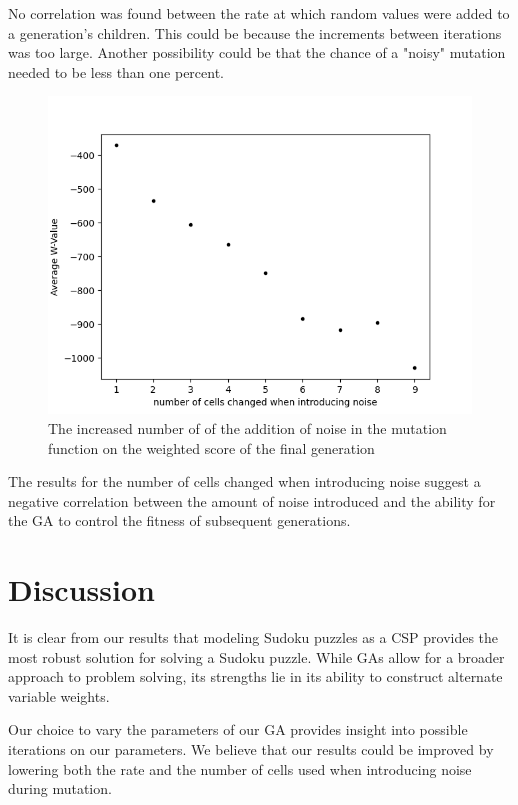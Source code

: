 \documentclass[12pt, conference]{IEEEtran}
\begin{document}
\par
No correlation was found between the rate at which random values were added to a generation's children.
This could be because the increments between iterations was too large.
Another possibility could be that the chance of a "noisy" mutation needed to be less than one percent.


\begin{figure}[H]
\centerline{\includegraphics[scale=0.5]{Figures/Mutation_Number_Averages.png}}
\caption{The increased number of   of the addition of noise in the mutation function on the weighted score of the final generation}
\label{fig. 2}
\end{figure}

\par
The results for the number of cells changed when introducing noise suggest a negative correlation between the amount of noise introduced and the ability for the GA to control the fitness of subsequent generations.

\section{Discussion}
It is clear from our results that modeling Sudoku puzzles as a CSP provides the most robust solution for solving a Sudoku puzzle.
While GAs allow for a broader approach to problem solving, its strengths lie in its ability to construct alternate variable weights.

\par
Our choice to vary the parameters of our GA provides insight into possible iterations on our parameters.
We believe that our results could be improved by lowering both the rate and the number of cells used when introducing noise during mutation.
\end{document}
